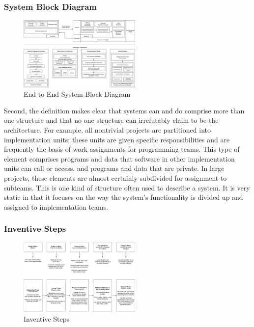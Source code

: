 \documentclass[conference,compsoc]{IEEEtran}
\begin{document}
\subsubsection{System Block Diagram}

\begin{figure}[H]
    \centering
    \includegraphics[width=6cm]{images/system-block-diagram.png}
    \caption{End-to-End System Block Diagram}
    \label{fig:system-block-diagram}
\end{figure}

Second, the definition makes clear that systems can and do comprise more than one structure and that no one structure can irrefutably
claim to be the architecture. For example, all nontrivial projects are partitioned into implementation units; these units are given specific
responsibilities and are frequently the basis of work assignments for programming teams. This type of element comprises programs and
data that software in other implementation units can call or access, and programs and data that are private. In large projects, these
elements are almost certainly subdivided for assignment to subteams. This is one kind of structure often used to describe a system. It is
very static in that it focuses on the way the system's functionality is divided up and assigned to implementation teams.

\subsubsection{Inventive Steps}

\begin{figure}[H]
    \centering
    \includegraphics[width=6cm]{images/inventive-steps.png}
    \caption{Inventive Steps}
    \label{fig:inventive-steps}
\end{figure}
\end{document}
